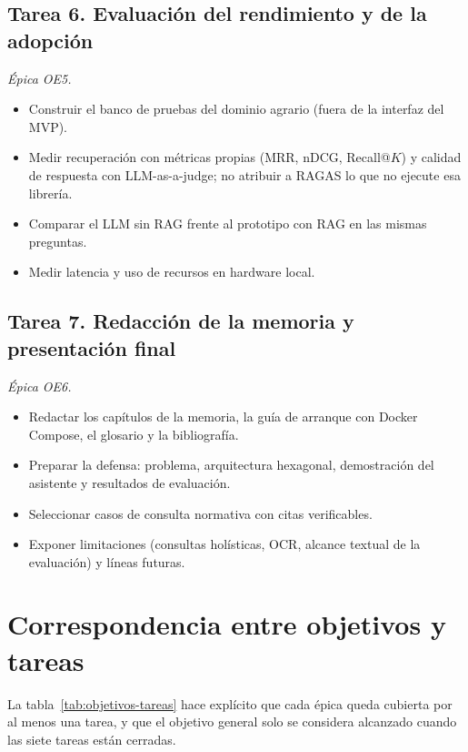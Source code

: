 \subsection{Tarea 6. Evaluación del rendimiento y de la adopción}
\textit{Épica OE5.}

\begin{itemize}
  \item Construir el banco de pruebas del dominio agrario (fuera de la interfaz del MVP).
  \item Medir recuperación con métricas propias (MRR, nDCG, Recall@$K$) y calidad de respuesta con LLM-as-a-judge; no atribuir a RAGAS lo que no ejecute esa librería.
  \item Comparar el LLM sin RAG frente al prototipo con RAG en las mismas preguntas.
  \item Medir latencia y uso de recursos en hardware local.
\end{itemize}

\subsection{Tarea 7. Redacción de la memoria y presentación final}
\textit{Épica OE6.}

\begin{itemize}
  \item Redactar los capítulos de la memoria, la guía de arranque con Docker Compose, el glosario y la bibliografía.
  \item Preparar la defensa: problema, arquitectura hexagonal, demostración del asistente y resultados de evaluación.
  \item Seleccionar casos de consulta normativa con citas verificables.
  \item Exponer limitaciones (consultas holísticas, OCR, alcance textual de la evaluación) y líneas futuras.
\end{itemize}

\section{Correspondencia entre objetivos y tareas}

La tabla~\ref{tab:objetivos-tareas} hace explícito que cada épica queda cubierta por al menos una tarea, y que el objetivo general solo se considera alcanzado cuando las siete tareas están cerradas.

